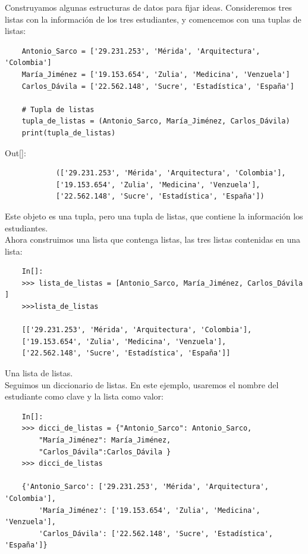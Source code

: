 Construyamos algunas estructuras de datos para fijar ideas. Consideremos tres listas con la información de los tres estudiantes, y comencemos con una tuplas de listas:

\hspace{-3cm}{\ttfamily \scriptsize estudiantes.py}  \vspace{-0.5cm}
\begin{lstlisting}
	Antonio_Sarco = ['29.231.253', 'Mérida', 'Arquitectura', 'Colombia']
	María_Jiménez = ['19.153.654', 'Zulia', 'Medicina', 'Venzuela']
	Carlos_Dávila = ['22.562.148', 'Sucre', 'Estadística', 'España']
	
	# Tupla de listas
	tupla_de_listas = (Antonio_Sarco, María_Jiménez, Carlos_Dávila)
	print(tupla_de_listas)
\end{lstlisting}	
{\ttfamily\scriptsize\scriptsize 
	\noindent Out[]: \vspace{-0.3cm}	
	{\color{blue} 	
		\begin{verbatim}
			(['29.231.253', 'Mérida', 'Arquitectura', 'Colombia'], 
			['19.153.654', 'Zulia', 'Medicina', 'Venzuela'],
			['22.562.148', 'Sucre', 'Estadística', 'España'])
		\end{verbatim}
}}
Este objeto es una tupla, pero una tupla de listas, que contiene la información los estudiantes.\\

Ahora construimos una lista que contenga listas, las tres listas contenidas en una lista:
\begin{lstlisting}
	In[]:
	>>> lista_de_listas = [Antonio_Sarco, María_Jiménez, Carlos_Dávila ]
	>>>lista_de_listas
	
	[['29.231.253', 'Mérida', 'Arquitectura', 'Colombia'], 
	['19.153.654', 'Zulia', 'Medicina', 'Venzuela'],
	['22.562.148', 'Sucre', 'Estadística', 'España']]
\end{lstlisting}

Una lista de listas.\\


Seguimos un diccionario de listas. En este ejemplo, usaremos el nombre del estudiante como clave y la lista como valor:

\begin{lstlisting}
	In[]:
	>>> dicci_de_listas = {"Antonio_Sarco": Antonio_Sarco,
		"María_Jiménez": María_Jiménez,
		"Carlos_Dávila":Carlos_Dávila }
	>>> dicci_de_listas
	
	{'Antonio_Sarco': ['29.231.253', 'Mérida', 'Arquitectura', 'Colombia'], 
		'María_Jiménez': ['19.153.654', 'Zulia', 'Medicina', 'Venzuela'],
		'Carlos_Dávila': ['22.562.148', 'Sucre', 'Estadística', 'España']}
\end{lstlisting}



